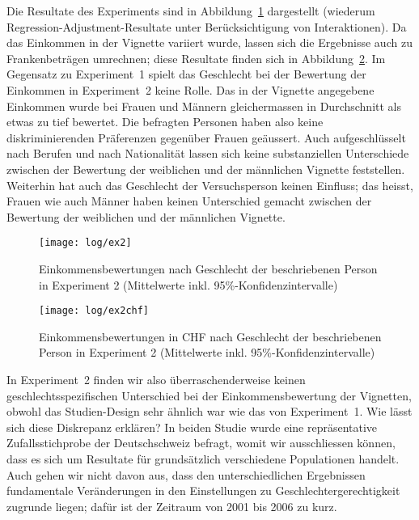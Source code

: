 \documentclass[a4paper,12pt]{article}
\begin{document}
 

\noindent 
Die Resultate des Experiments sind in Abbildung~\ref{fig-ex2}
dargestellt (wiederum Regression-Adjustment-Resultate unter Berücksichtigung
von Interaktionen). Da das Einkommen in der Vignette variiert wurde, lassen sich die 
Ergebnisse auch zu Frankenbeträgen umrechnen; diese Resultate finden sich in 
Abbildung~\ref{fig-ex2chf}. Im Gegensatz zu Experiment~1 spielt das Geschlecht bei der
Bewertung der Einkommen in Experiment~2 keine Rolle. Das in der Vignette
angegebene Einkommen wurde bei Frauen und Männern gleichermassen in
Durchschnitt als etwas zu tief bewertet. Die befragten Personen haben also
keine diskriminierenden Präferenzen gegenüber Frauen geäussert. Auch
aufgeschlüsselt nach Berufen und nach Nationalität lassen sich keine
substanziellen Unterschiede zwischen der Bewertung der weiblichen und der
männlichen Vignette feststellen. Weiterhin hat auch das Geschlecht der
Versuchsperson keinen Einfluss; das heisst, Frauen wie auch Männer haben keinen
Unterschied gemacht zwischen der Bewertung der weiblichen und der männlichen
Vignette.

\begin{figure}\centering
    \texttt{[image: log/ex2]}
    \caption{Einkommensbewertungen nach Geschlecht der beschriebenen Person in 
    Experiment 2 (Mittelwerte inkl. 95\%-Konfidenzintervalle)}\label{fig-ex2}
\end{figure}
\begin{figure}\centering
    \texttt{[image: log/ex2chf]}
    \caption{Einkommensbewertungen in CHF nach Geschlecht der beschriebenen Person in 
    Experiment 2 (Mittelwerte inkl. 95\%-Konfidenzintervalle)}\label{fig-ex2chf}
\end{figure}


In Experiment~2 finden wir also überraschenderweise keinen geschlechtsspezifischen
Unterschied bei der Einkommensbewertung der Vignetten, obwohl das
Studien-Design sehr ähnlich war wie das von Experiment~1. Wie lässt sich diese
Diskrepanz erklären? In beiden Studie wurde eine repräsentative
Zufallsstichprobe der Deutschschweiz befragt, womit wir ausschliessen können,
dass es sich um Resultate für grundsätzlich verschiedene Populationen handelt.
Auch gehen wir nicht davon aus, dass den unterschiedlichen Ergebnissen
fundamentale Veränderungen in den Einstellungen zu Geschlechtergerechtigkeit
zugrunde liegen; dafür ist der Zeitraum von 2001 bis 2006 zu kurz.
\end{document}
